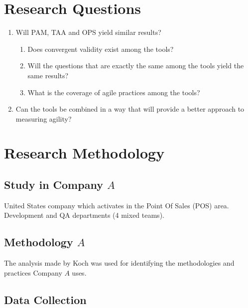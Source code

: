 
\section{Research Questions}

\begin{enumerate}
	\item Will PAM, TAA and OPS yield similar results?
	\begin{enumerate}[label*=\arabic*.]
  		\item Does convergent validity exist among the tools?
  		\item Will the questions that are exactly the same among the tools yield the same results?
		\item What is the coverage of agile practices among the tools?
	\end{enumerate}	
  	\item Can the tools be combined in a way that will provide a better approach to measuring agility?
\end{enumerate}

\clearpage



\section{Research Methodology}


\subsection*{Study in Company $A$}

United States company which activates in the Point Of Sales (POS) area. \\
Development and QA departments (4 mixed teams). \\

\subsection*{Methodology $A$}
The analysis made by Koch \cite{koch2005agile} was used for identifying the methodologies and practices Company $A$ uses.

\subsection*{Data Collection}

